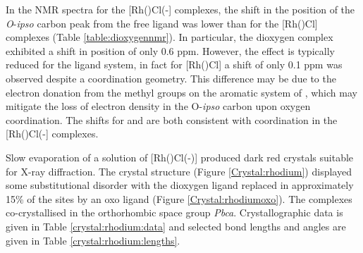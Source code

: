 
In the \carbon{} NMR spectra for the [Rh(\tBuxantphos)Cl(-] complexes, the shift in the position of the \emph{O}-\emph{ipso} carbon peak from the free ligand was lower than for the [Rh(\tBuxantphos)Cl] complexes (Table \ref{table:dioxygennmr}).  In particular, the \tButhixantphos{} dioxygen complex exhibited a shift in position of only 0.6 ppm.  However, the effect is typically reduced for the \tButhixantphos{} ligand system, in fact for [Rh(\tButhixantphos)Cl] a shift of only 0.1 ppm was observed despite a \POP{} coordination geometry.  This difference may be due to the electron donation from the methyl groups on the aromatic system of \tButhixantphos{}, which may mitigate the loss of electron density in the O-\emph{ipso} carbon upon oxygen coordination.  The shifts for \tBusixantphos{} and \tBuxantphos{} are both consistent with \POP{} coordination in the [Rh(\tBuxantphos)Cl(-] complexes.  

Slow evaporation of a  solution of [Rh(\tBuxantphosk)Cl(-)] produced dark red crystals suitable for X-ray diffraction.  The crystal structure (Figure \ref{Crystal:rhodium}) displayed some substitutional disorder with the dioxygen ligand replaced in approximately 15\% of the sites by an oxo ligand (Figure \ref{Crystal:rhodiumoxo}).  The complexes co-crystallised in the orthorhombic space group \emph{Pbca}.  Crystallographic data is given in Table \ref{crystal:rhodium:data} and selected bond lengths and angles are given in Table \ref{crystal:rhodium:lengths}.



